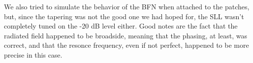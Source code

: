 \par\medskip
\noindent
We also tried to simulate the behavior of the BFN when attached to the patches, but, since the tapering was not the good one we had hoped for, the SLL wasn't completely tuned on the -20 dB level either. Good notes are the fact that the radiated field happened to be broadside, meaning that the phasing, at least, was correct, and that the resonce frequency, even if not perfect, happened to be more precise in this case.